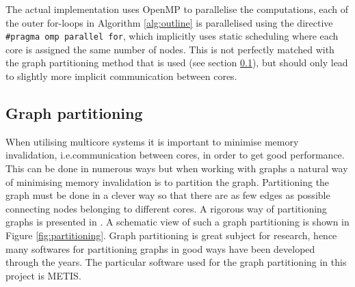 The actual implementation uses OpenMP to parallelise the computations, each of the outer for-loops in Algorithm \ref{alg:outline} is parallelised using the directive \texttt{\#pragma omp parallel for}, which implicitly uses static scheduling where each core is assigned the same number of nodes. This is not perfectly matched with the graph partitioning method that is used (see section \ref{sec:graph_part}), but should only lead to slightly more implicit communication between cores.

\subsection{Graph partitioning}
\label{sec:graph_part}
When utilising multicore systems it is important to minimise memory invalidation, i.e.\@ communication between cores, in order to get good performance. This can be done in numerous ways but when working with graphs a natural way of minimising memory invalidation is to partition the graph. Partitioning the graph must be done in a clever way so that there are as few edges as possible connecting nodes belonging to different cores. A rigorous way of partitioning graphs is presented in \cite{Lasalle}. A schematic view of such a graph partitioning is shown in Figure \ref{fig:partitioning}. Graph partitioning is great subject for research, hence many softwares for partitioning graphs in good ways have been developed through the years. The particular software used for the graph partitioning in this project is METIS. 

